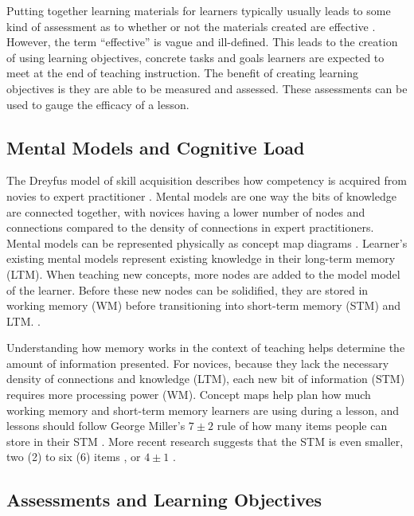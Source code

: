 \documentclass[acmsmall]{acmart}
\begin{document}
Putting together learning materials for learners typically usually leads to some kind of
assessment as to whether or not the materials created are effective
\cite{ambrose2010learning, wilson2019teaching}.
However, the term ``effective'' is vague and ill-defined.
This leads to the creation of using learning objectives,
concrete tasks and goals learners are expected to meet at the end of teaching instruction.
The benefit of creating learning objectives is they are able to be measured and assessed.
These assessments can be used to gauge the efficacy of a lesson.

\subsection{Mental Models and Cognitive Load}

The Dreyfus model of skill acquisition describes how competency is acquired from
novies to expert practitioner
\cite{dreyfus1980five, bennerUsingDreyfusModel2004}.
Mental models are one way the bits of knowledge are connected together,
with novices having a lower number of nodes and connections compared to the
density of connections in expert practitioners.
Mental models can be represented physically as concept map diagrams
\cite{Koch2016, wilson2019teaching}.
Learner's existing mental models represent existing knowledge in their long-term memory (LTM).
When teaching new concepts,
more nodes are added to the model model of the learner.
Before these new nodes can be solidified, they are stored in working memory (WM)
before transitioning into short-term memory (STM) and LTM.
\cite{Koch2016, hermansProgrammerBrain2021, wilson2019teaching}.

Understanding how memory works in the context of teaching
helps determine the amount of information presented.
For novices, because they lack the necessary density of connections and knowledge (LTM),
each new bit of information (STM) requires more processing power (WM).
Concept maps help plan how much working memory and short-term memory learners are using during a lesson,
and lessons should follow George Miller's $7\pm2$ rule of how many items people can store in their STM
\cite{miller1956magical}.
More recent research suggests that the STM is even smaller, two (2) to six (6) items
\cite{hermansProgrammerBrain2021},
or $4\pm1$ \cite{didauWhatEveryTeacher2016}.

\subsection{Assessments and Learning Objectives}
\end{document}
